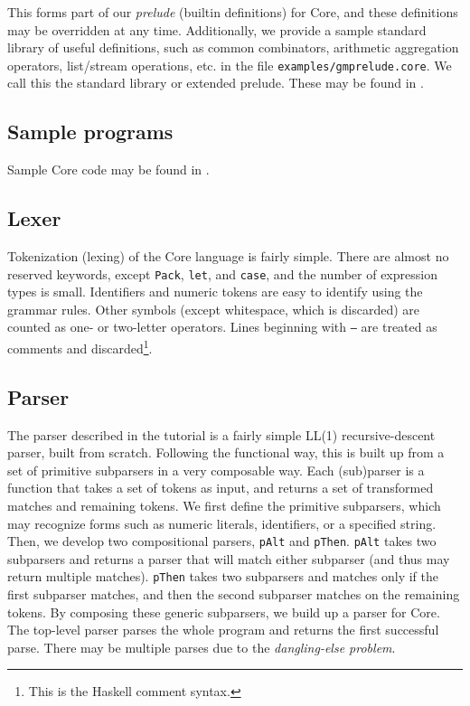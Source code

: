 This forms part of our \textit{prelude} (builtin definitions) for Core, and these definitions may be overridden at any time. Additionally, we provide a sample standard library of useful definitions, such as common combinators, arithmetic aggregation operators, list/stream operations, etc. in the file \texttt{examples/gmprelude.core}. We call this the standard library or extended prelude. These may be found in .

\subsection{Sample programs}
\label{sec:sample-programs}

Sample Core code may be found in .

\subsection{Lexer}
\label{sec:lexer}

Tokenization (lexing) of the Core language is fairly simple. There are almost no reserved keywords, except \texttt{Pack}, \texttt{let}, and \texttt{case}, and the number of expression types is small. Identifiers and numeric tokens are easy to identify using the grammar rules. Other symbols (except whitespace, which is discarded) are counted as one- or two-letter operators. Lines beginning with \texttt{--} are treated as comments and discarded\footnote{This is the Haskell comment syntax.}.

\subsection{Parser}
\label{sec:parser}

The parser described in the tutorial is a fairly simple LL(1) recursive-descent parser, built from scratch. Following the functional way\texttrademark{}, this is built up from a set of primitive subparsers in a very composable way. Each (sub)parser is a function that takes a set of tokens as input, and returns a set of transformed matches and remaining tokens. We first define the primitive subparsers, which may recognize forms such as numeric literals, identifiers, or a specified string. Then, we develop two compositional parsers, \texttt{pAlt} and \texttt{pThen}. \texttt{pAlt} takes two subparsers and returns a parser that will match either subparser (and thus may return multiple matches). \texttt{pThen} takes two subparsers and matches only if the first subparser matches, and then the second subparser matches on the remaining tokens. By composing these generic subparsers, we build up a parser for Core. The top-level parser parses the whole program and returns the first successful parse. There may be multiple parses due to the \textit{dangling-else problem}.

